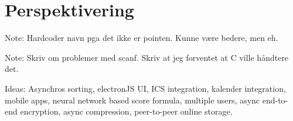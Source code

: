 \section{Perspektivering}
\label{sec:Perspektivering}
Note: Hardcoder navn pga det ikke er pointen. Kunne v{\ae}re bedere, men eh.

Note: Skriv om problemer med scanf. Skriv at jeg forventet at C ville h{\aa}ndtere det.

Ideas: Asynchros sorting, electronJS UI, ICS integration, kalender integration, mobile apps, neural network based score formula, multiple users, async end-to-end encryption, async compression, peer-to-peer online storage. 